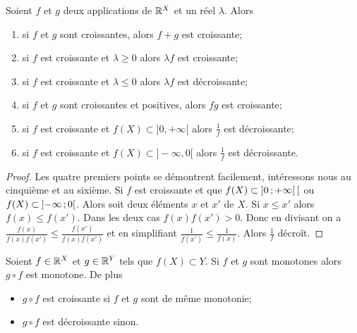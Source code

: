 \begin{prop}
  Soient $f$ et $g$ deux applications de $\mathbb{R}^X$ et un réel $\lambda$. Alors
  \begin{enumerate}
  \item si $f$ et $g$ sont croissantes, alors $f+g$ est croissante;
  \item si $f$ est croissante et $\lambda \geqslant 0$ alors $\lambda f$ est croissante;
  \item si $f$ est croissante et $\lambda \leqslant 0$ alors $\lambda f$ est décroissante;
  \item si $f$ et $g$ sont croissantes et positives, alors $fg$ est croissante;
  \item si $f$ est croissante et $f(X)\subset ]0,+\infty[$ alors $\frac{1}{f}$ est décroissante;
  \item si $f$ est croissante et $f(X)\subset ]-\infty, 0[$ alors $\frac{1}{f}$ est décroissante.
  \end{enumerate}
\end{prop}
\begin{proof}
  Les quatre premiers points se démontrent facilement, intéressons nous au cinquième et au sixième. Si $f$ est croissante et que $f(X)\subset \left] 0 \, ;  +\infty \right[[$ ou $f(X)\subset \left] -\infty \, ;  0 \right[$. Alors soit deux éléments $x$ et $x'$ de $X$. Si $x \leqslant x'$  alors $f(x) \leqslant f(x')$. Dans les deux cas $f(x)f(x') > 0$. Donc en divisant on a $\frac{f(x)}{f(x)f(x')} \leqslant \frac{f(x')}{f(x)f(x')}$ et en simplifiant $\frac{1}{f(x')} \leqslant \frac{1}{f(x)}$. Alors $\frac{1}{f}$ décroît.
\end{proof}
\begin{theo}
  Soient $f \in \mathbb{R}^X$ et $g \in \mathbb{R}^Y$ tels que $f(X) \subset Y$. Si $f$ et $g$ sont monotones alors $g \circ f$ est monotone. De plus
  \begin{itemize}
  \item $g \circ f$ est croissante si $f$ et $g$ sont de même monotonie;
  \item $g \circ f$ est décroissante sinon.
  \end{itemize}
\end{theo}

